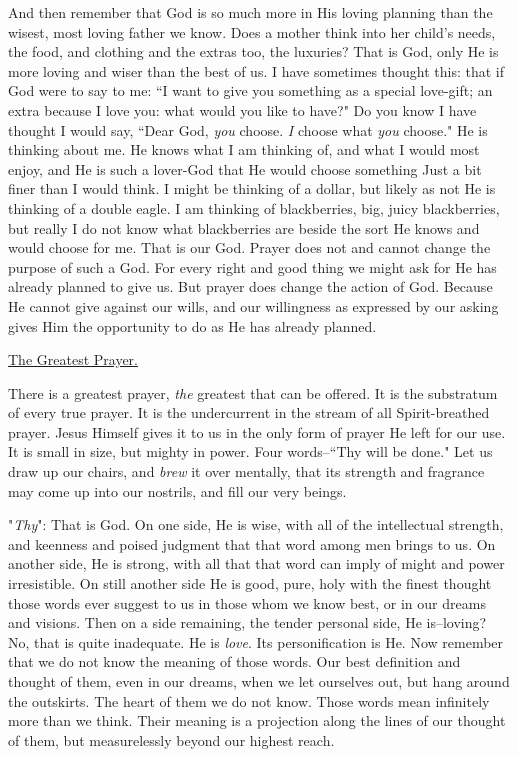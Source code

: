 And then remember that God is so much more in His loving planning than the
wisest, most loving father we know. Does a mother think into her child's
needs, the food, and clothing and the extras too, the luxuries? That is
God, only He is more loving and wiser than the best of us. I have
sometimes thought this: that if God were to say to me: ``I want to give you
something as a special love-gift; an extra because I love you: what would
you like to have?" Do you know I have thought I would say, ``Dear God,
\textit{you} choose. \textit{I} choose what \textit{you} choose." He is thinking about me. He
knows what I am thinking of, and what I would most enjoy, and He is such a
lover-God that He would choose something Just a bit finer than I would
think. I might be thinking of a dollar, but likely as not He is thinking
of a double eagle. I am thinking of blackberries, big, juicy blackberries,
but really I do not know what blackberries are beside the sort He knows
and would choose for me. That is our God. Prayer does not and cannot
change the purpose of such a God. For every right and good thing we might
ask for He has already planned to give us. But prayer does change the
action of God. Because He cannot give against our wills, and our
willingness as expressed by our asking gives Him the opportunity to do as
He has already planned.



\underline{The Greatest Prayer.}


There is a greatest prayer, \textit{the} greatest that can be offered. It is the
substratum of every true prayer. It is the undercurrent in the stream of
all Spirit-breathed prayer. Jesus Himself gives it to us in the only form
of prayer He left for our use. It is small in size, but mighty in power.
Four words--``Thy will be done." Let us draw up our chairs, and \textit{brew} it
over mentally, that its strength and fragrance may come up into our
nostrils, and fill our very beings.

"\textit{Thy}": That is God. On one side, He is wise, with all of the
intellectual strength, and keenness and poised judgment that that word
among men brings to us. On another side, He is strong, with all that that
word can imply of might and power irresistible. On still another side He
is good, pure, holy with the finest thought those words ever suggest to us
in those whom we know best, or in our dreams and visions. Then on a side
remaining, the tender personal side, He is--loving? No, that is quite
inadequate. He is \textit{love}. Its personification is He. Now remember that we
do not know the meaning of those words. Our best definition and thought of
them, even in our dreams, when we let ourselves out, but hang around the
outskirts. The heart of them we do not know. Those words mean infinitely
more than we think. Their meaning is a projection along the lines of our
thought of them, but measurelessly beyond our highest reach.

